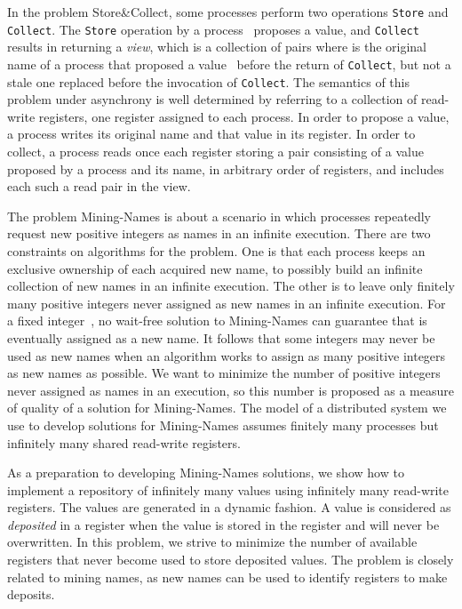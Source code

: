 \documentclass[11pt]{article}
\begin{document}
In the problem Store\&Collect, some  processes perform two operations \texttt{Store} and \texttt{Collect}.
The \texttt{Store} operation by a process~ proposes a value, and \texttt{Collect} results in returning a \emph{view}, which is a collection of pairs  where  is the original name of a process that proposed a value~ before the return of \texttt{Collect}, but not a stale one replaced before the invocation of \texttt{Collect}.
The semantics of this problem under asynchrony is well determined by referring to a collection of read-write registers, one register assigned to each process.
In order to propose a value, a process writes its original name and that value in its register.
In order to collect, a process reads once each register storing a pair consisting of a value proposed by a process and its name, in arbitrary order of registers, and includes each such a read pair in the view.

The problem Mining-Names is about a scenario in which processes repeatedly request new positive integers as names in an infinite execution.
There are two constraints on algorithms for the problem. 
One is that each process keeps an exclusive ownership of each acquired new name, to possibly build an infinite collection of new names in an infinite execution.
The other is to leave only finitely many positive integers never assigned as new names in an infinite execution. 
For a fixed integer~, no wait-free solution to Mining-Names can guarantee that  is eventually assigned as a new name.
It follows that some integers may never be used as new names when an algorithm works to assign as many positive integers as new names as possible.
We want to minimize the number of positive integers never assigned as names in an execution, so this number  is proposed as a measure of quality of a solution for Mining-Names.
The model of a distributed system we use to develop solutions for Mining-Names assumes finitely many processes but infinitely many shared read-write registers.


As a preparation to developing Mining-Names solutions, we show how  to implement a repository of infinitely many values using infinitely many  read-write registers. 
The values are generated in a dynamic fashion.
A value is considered as \emph{deposited} in a register when the value is stored in the  register and will never be overwritten.
In this problem, we strive to minimize the number of available registers  that never become used to store deposited values.
The problem is closely related to mining names, as new names can be used to identify registers to make deposits.
\end{document}
